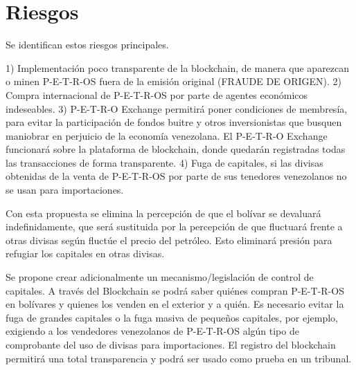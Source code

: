 %
\section{Riesgos}
\label{sec:riesgo}
%
Se identifican estos riesgos principales.

    1) Implementación poco transparente de la blockchain, de manera que aparezcan o minen P-E-T-R-OS fuera de la emisión original (FRAUDE DE ORIGEN).
    2) Compra internacional de P-E-T-R-OS por parte de agentes económicos indeseables.
    3) P-E-T-R-O Exchange permitirá poner condiciones de membresía, para evitar la participación de fondos buitre y otros inversionistas que busquen maniobrar en perjuicio de la economía venezolana. El P-E-T-R-O Exchange funcionará sobre la plataforma de blockchain, donde quedarán registradas todas las transacciones de forma transparente.
    4) Fuga de capitales, si las divisas obtenidas de la venta de P-E-T-R-OS por parte de sus tenedores venezolanos no se usan para importaciones.

Con esta propuesta se elimina la percepción de que el bolívar se devaluará indefinidamente, que será sustituida por la percepción de que fluctuará frente a otras divisas según fluctúe el precio del petróleo. Esto eliminará presión para refugiar los capitales en otras divisas.

Se propone crear adicionalmente un mecanismo/legislación de control de capitales. A través del Blockchain se podrá saber quiénes compran P-E-T-R-OS en bolívares y quienes los venden en el exterior y a quién. Es necesario evitar la fuga de grandes capitales o la fuga masiva de pequeños capitales, por ejemplo, exigiendo a los vendedores venezolanos de P-E-T-R-OS algún tipo de comprobante del uso de divisas para importaciones. El registro del blockchain permitirá una total transparencia y podrá ser usado como prueba en un tribunal.